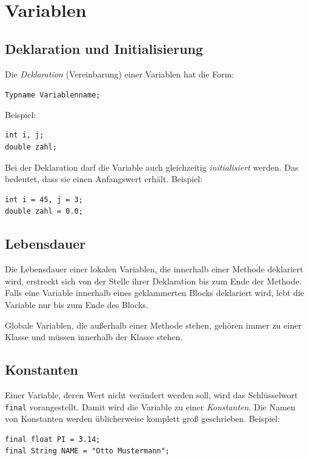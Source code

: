 \section{Variablen}

\subsection{Deklaration und Initialisierung}

Die \emph{Deklaration} (Vereinbarung) einer Variablen hat die Form:

\lstinline|Typname Variablenname;|

Beispiel:

\begin{lstlisting}
int i, j;
double zahl;
\end{lstlisting}


Bei der Deklaration darf die Variable auch gleichzeitig \emph{initialisiert}
werden.
Das bedeutet, dass sie einen Anfangswert erhält. Beispiel:

\begin{lstlisting}
int i = 45, j = 3;
double zahl = 0.0;
\end{lstlisting}

\subsection{Lebensdauer}

Die Lebensdauer einer lokalen Variablen, die innerhalb einer Methode deklariert
wird, erstreckt sich von der Stelle ihrer Deklaration bis zum Ende der Methode.
Falls eine Variable innerhalb eines geklammerten Blocks deklariert wird, lebt
die Variable nur bis zum Ende des Blocks.

Globale Variablen, die außerhalb einer Methode stehen, gehören immer zu einer
Klasse und müssen innerhalb der Klasse stehen.

\subsection{Konstanten}

Einer Variable, deren Wert nicht verändert werden soll, wird das Schlüsselwort
\lstinline|final| vorangestellt. Damit wird die Variable zu einer
\emph{Konstanten}. Die Namen von Konstanten werden üblicherweise komplett groß
geschrieben. Beispiel:

\begin{lstlisting}
final float PI = 3.14;
final String NAME = "Otto Mustermann";
\end{lstlisting}


